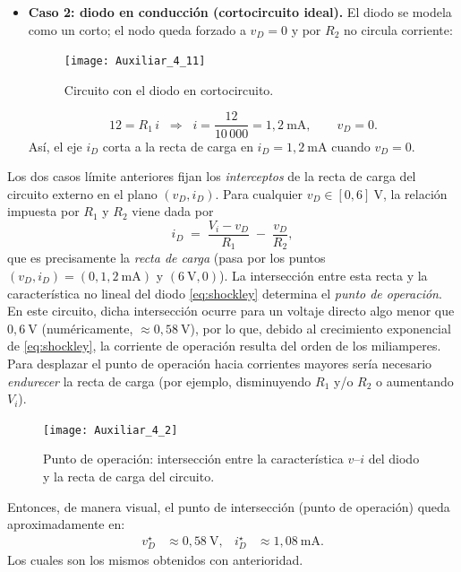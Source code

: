 \documentclass[
  11pt,
  letterpaper,
   addpoints,
   answers
  ]{exam}
\begin{document}
\begin{questions}
\begin{solution}
\begin{itemize}
  \item \textbf{Caso 2: diodo en conducción (cortocircuito ideal).} El diodo se modela como un corto; el nodo queda forzado a $v_D=0$ y por $R_2$ no circula corriente:
  \begin{figure}[H]
    \centering
    \texttt{[image: Auxiliar\_4\_11]}
    \caption{Circuito con el diodo en cortocircuito.}
    \label{fig:th_norton_3}
  \end{figure}
  \vspace{-0.6em}
  \[
    12 = R_1\,i
    \;\;\Rightarrow\;\;
    i=\frac{12}{10\,000}=1{,}2~\mathrm{mA},
    \qquad
    v_D=0.
  \]
  Así, el eje $i_D$ corta a la recta de carga en $i_D=1{,}2~\mathrm{mA}$ cuando $v_D=0$.
\end{itemize}

Los dos casos límite anteriores fijan los \emph{interceptos} de la recta de carga del circuito externo en el plano $(v_D,i_D)$. Para cualquier $v_D\in[0,6]~\mathrm{V}$, la relación impuesta por $R_1$ y $R_2$ viene dada por
\[
  i_D \;=\; \frac{V_i - v_D}{R_1} \;-\; \frac{v_D}{R_2},
\]
que es precisamente la \emph{recta de carga} (pasa por los puntos $(v_D,i_D)=(0,1{,}2~\mathrm{mA})$ y $(6~\mathrm{V},0)$).
La intersección entre esta recta y la característica no lineal del diodo \eqref{eq:shockley} determina el \emph{punto de operación}. En este circuito, dicha intersección ocurre para un voltaje directo algo menor que $0{,}6~\mathrm{V}$ (numéricamente, $\approx 0{,}58~\mathrm{V}$), por lo que, debido al crecimiento exponencial de \eqref{eq:shockley}, la corriente de operación resulta del orden de los miliamperes. Para desplazar el punto de operación hacia corrientes mayores sería necesario \emph{endurecer} la recta de carga (por ejemplo, disminuyendo $R_1$ y/o $R_2$ o aumentando $V_i$).

\begin{figure}[H]
  \centering
  \texttt{[image: Auxiliar\_4\_2]}
  \caption{Punto de operación: intersección entre la característica $v$–$i$ del diodo y la recta de carga del circuito.}
  \label{fig:th_norton_6}
\end{figure}
Entonces, de manera visual, el punto de intersección (punto de operación) queda aproximadamente en:
\begin{align}
  v_D^\star &\approx 0{,}58~\mathrm{V}, &
  i_D^\star &\approx 1{,}08~\mathrm{mA}.
\end{align}
Los cuales son los mismos obtenidos con anterioridad.
\end{solution}


\end{questions}
\end{document}
